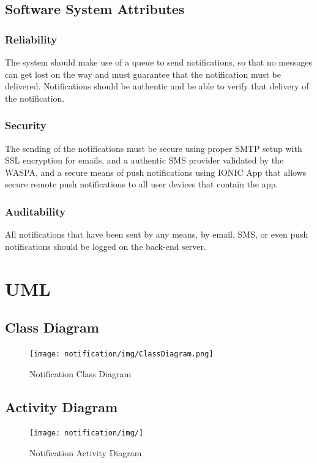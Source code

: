 \subsection{Software System Attributes}
\subsubsection{Reliability}
The system should make use of a queue to send notifications, so that no messages can get lost on the way and must guarantee that the notification must be delivered.
Notifications should be authentic and be able to verify that delivery of the notification.

\subsubsection{Security}
The sending of the notifications must be secure using proper SMTP setup with SSL encryption for emails, and a authentic SMS provider validated by the WASPA, and a secure means of push notifications using IONIC App that allows secure remote push notifications to all user devices that contain the app.

\subsubsection{Auditability}
All notifications that have been sent by any means, by email, SMS, or even push notifications should be logged on the back-end server.


\section{UML}
\subsection{Class Diagram}


\begin{figure}[H]
	\centering
	\texttt{[image: notification/img/ClassDiagram.png]}
	\caption{Notification Class Diagram}
\end{figure}


\subsection{Activity Diagram}

\begin{figure}[H]
	\centering
	\texttt{[image: notification/img/]}
	\caption{Notification Activity Diagram}
\end{figure}



